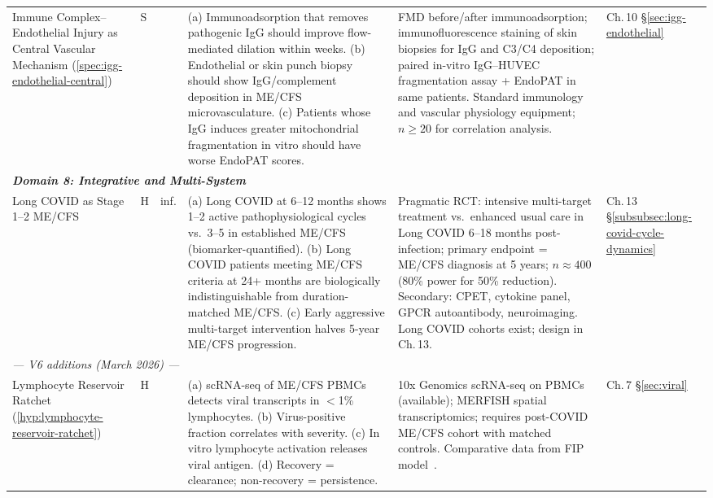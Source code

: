 \begin{longtable}{%
  p{3.0cm}
  >{\centering\arraybackslash}p{0.55cm}
  >{\centering\arraybackslash}p{1.0cm}
  p{3.8cm}
  p{3.8cm}
  p{2.2cm}
}
Immune Complex--Endothelial Injury as Central Vascular Mechanism
(\ref{spec:igg-endothelial-central})
&
S & 0.35
&
(a) Immunoadsorption that removes pathogenic IgG should improve flow-mediated
dilation within weeks.
(b) Endothelial or skin punch biopsy should show IgG/complement deposition in
ME/CFS microvasculature.
(c) Patients whose IgG induces greater mitochondrial fragmentation in vitro
should have worse EndoPAT scores.
&
FMD before/after immunoadsorption; immunofluorescence staining of skin biopsies
for IgG and C3/C4 deposition; paired in-vitro IgG--HUVEC fragmentation assay +
EndoPAT in same patients.
Standard immunology and vascular physiology equipment; $n \geq 20$ for
correlation analysis.
&
Ch.\,10 \S\ref{sec:igg-endothelial} \\[6pt]

\multicolumn{6}{l}{\small\textit{\textbf{Domain 8: Integrative and Multi-System}}} \\[2pt]

Long COVID as Stage 1--2 ME/CFS
&
H & inf.
&
(a) Long COVID at 6--12 months shows 1--2 active pathophysiological cycles vs.\
3--5 in established ME/CFS (biomarker-quantified).
(b) Long COVID patients meeting ME/CFS criteria at 24+ months are biologically
indistinguishable from duration-matched ME/CFS.
(c) Early aggressive multi-target intervention halves 5-year ME/CFS progression.
&
Pragmatic RCT: intensive multi-target treatment vs.\ enhanced usual care
in Long COVID 6--18 months post-infection;
primary endpoint = ME/CFS diagnosis at 5 years;
$n \approx 400$ (80\% power for 50\% reduction).
Secondary: CPET, cytokine panel, GPCR autoantibody, neuroimaging.
Long COVID cohorts exist; design in Ch.\,13.
&
Ch.\,13 \S\ref{subsubsec:long-covid-cycle-dynamics} \\[6pt]

\midrule
\multicolumn{6}{l}{\textit{--- V6 additions (March 2026) ---}}\\[3pt]

Lymphocyte Reservoir Ratchet
(\ref{hyp:lymphocyte-reservoir-ratchet})
& H & 0.35 &
(a) scRNA-seq of ME/CFS PBMCs detects viral transcripts in $<$1\% lymphocytes.
(b) Virus-positive fraction correlates with severity.
(c) In vitro lymphocyte activation releases viral antigen.
(d) Recovery = clearance; non-recovery = persistence.
&
10x Genomics scRNA-seq on PBMCs (available); MERFISH spatial transcriptomics;
requires post-COVID ME/CFS cohort with matched controls.
Comparative data from FIP model~\cite{Kol2026fipv}.
&
Ch.\,7 \S\ref{sec:viral} \\[6pt]


\end{longtable}
